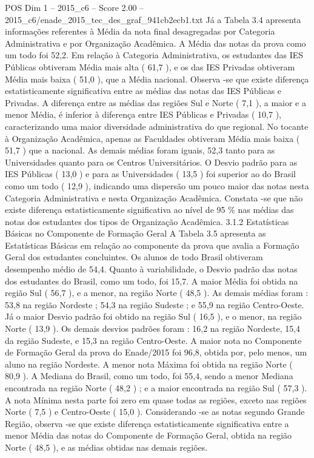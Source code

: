 \begin{textsample}{POS Dim 1 – 2015\_c6 – Score 2.00 – 2015\_c6/enade\_2015\_tec\_des\_graf\_941cb2ecb1.txt}
Já a Tabela 3.4 apresenta informações referentes à Média da nota final desagregadas por Categoria Administrativa e por Organização Acadêmica.
A Média das notas da prova como um todo foi 52,2.
Em relação à Categoria Administrativa, os estudantes das IES Públicas obtiveram Média mais alta ( 61,7 ), e os das IES Privadas obtiveram Média mais baixa ( 51,0 ), que a Média nacional.
Observa -se que existe diferença estatisticamente significativa entre as médias das notas das IES Públicas e Privadas.
A diferença entre as médias das regiões Sul e Norte ( 7,1 ), a maior e a menor Média, é inferior à diferença entre IES Públicas e Privadas ( 10,7 ), caracterizando uma maior diversidade administrativa do que regional.
No tocante à Organização Acadêmica, apenas as Faculdades obtiveram Média mais baixa ( 51,7 ) que a nacional.
As demais médias foram iguais, 52,3 tanto para as Universidades quanto para os Centros Universitários.
O Desvio padrão para as IES Públicas ( 13,0 ) e para as Universidades ( 13,5 ) foi superior ao do Brasil como um todo ( 12,9 ), indicando uma dispersão um pouco maior das notas nesta Categoria Administrativa e nesta Organização Acadêmica.
Constata -se que não existe diferença estatisticamente significativa ao nível de 95 \% nas médias das notas dos estudantes dos tipos de Organização Acadêmica. 3.1.2 Estatísticas Básicas no Componente de Formação Geral A Tabela 3.5 apresenta as Estatísticas Básicas em relação ao componente da prova que avalia a Formação Geral dos estudantes concluintes.
Os alunos de todo Brasil obtiveram desempenho médio de 54,4.
Quanto à variabilidade, o Desvio padrão das notas dos estudantes do Brasil, como um todo, foi 15,7.
A maior Média foi obtida na região Sul ( 56,7 ), e a menor, na região Norte ( 48,5 ).
As demais médias foram : 53,8 na região Nordeste ; 54,3 na região Sudeste ; e 55,9 na região Centro-Oeste.
Já o maior Desvio padrão foi obtido na região Sul ( 16,5 ), e o menor, na região Norte ( 13,9 ).
Os demais desvios padrões foram : 16,2 na região Nordeste, 15,4 da região Sudeste, e 15,3 na região Centro-Oeste.
A maior nota no Componente de Formação Geral da prova do Enade/2015 foi 96,8, obtida por, pelo menos, um aluno na região Nordeste.
A menor nota Máxima foi obtida na região Norte ( 80,9 ).
A Mediana do Brasil, como um todo, foi 55,4, sendo a menor Mediana encontrada na região Norte ( 48,2 ) ; e a maior encontrada na região Sul ( 57,3 ).
A nota Mínima nesta parte foi zero em quase todas as regiões, exceto nas regiões Norte ( 7,5 ) e Centro-Oeste ( 15,0 ).
Considerando -se as notas segundo Grande Região, observa -se que existe diferença estatisticamente significativa entre a menor Média das notas do Componente de Formação Geral, obtida na região Norte ( 48,5 ), e as médias obtidas nas demais regiões.

\end{textsample}
